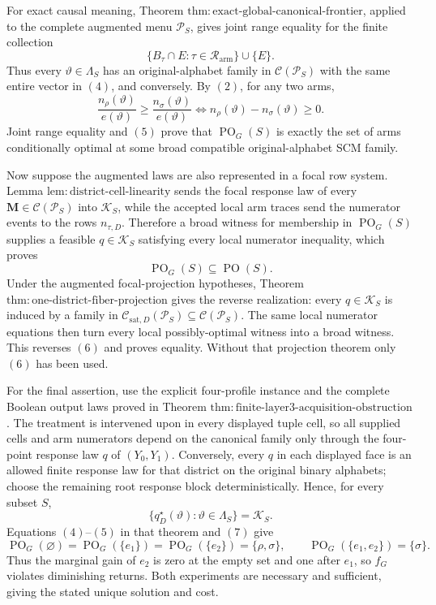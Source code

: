 For exact causal meaning, Theorem \(\mathrm{thm:exact\text{-}global\text{-}canonical\text{-}frontier}\), applied to the complete augmented menu \(\mathcal P_S\), gives joint range equality for the finite collection
\[
\{B_\tau\cap E:\tau\in\mathcal R_{\mathrm{arm}}\}\cup\{E\}.
\tag{4}
\]
Thus every \(\vartheta\in\Lambda_S\) has an original-alphabet family in \(\mathcal C(\mathcal P_S)\) with the same entire vector in \((4)\), and conversely.  By \((2)\), for any two arms,
\[
\frac{n_\rho(\vartheta)}{e(\vartheta)}
\geq
\frac{n_\sigma(\vartheta)}{e(\vartheta)}
\Longleftrightarrow
n_\rho(\vartheta)-n_\sigma(\vartheta)\geq0.
\tag{5}
\]
Joint range equality and \((5)\) prove that \(\operatorname{PO}_G(S)\) is exactly the set of arms conditionally optimal at some broad compatible original-alphabet SCM family.

Now suppose the augmented laws are also represented in a focal row system.  Lemma \(\mathrm{lem:district\text{-}cell\text{-}linearity}\) sends the focal response law of every \(\mathbf M\in\mathcal C(\mathcal P_S)\) into \(\mathcal K_S\), while the accepted local arm traces send the numerator events to the rows \(n_{\tau,D}\).  Therefore a broad witness for membership in \(\operatorname{PO}_G(S)\) supplies a feasible \(q\in\mathcal K_S\) satisfying every local numerator inequality, which proves
\[
\operatorname{PO}_G(S)\subseteq\operatorname{PO}(S).
\tag{6}
\]
Under the augmented focal-projection hypotheses, Theorem \(\mathrm{thm:one\text{-}district\text{-}fiber\text{-}projection}\) gives the reverse realization: every \(q\in\mathcal K_S\) is induced by a family in \(\mathcal C_{\mathrm{sat},D}(\mathcal P_S)\subseteq\mathcal C(\mathcal P_S)\).  The same local numerator equations then turn every local possibly-optimal witness into a broad witness.  This reverses \((6)\) and proves equality.  Without that projection theorem only \((6)\) has been used.

For the final assertion, use the explicit four-profile instance and the complete Boolean output laws proved in Theorem \(\mathrm{thm:finite\text{-}layer3\text{-}acquisition\text{-}obstruction}\).  The treatment is intervened upon in every displayed tuple cell, so all supplied cells and arm numerators depend on the canonical family only through the four-point response law \(q\) of \((Y_0,Y_1)\).  Conversely, every \(q\) in each displayed face is an allowed finite response law for that district on the original binary alphabets; choose the remaining root response block deterministically.  Hence, for every subset \(S\),
\[
\{q_D^\star(\vartheta):\vartheta\in\Lambda_S\}=\mathcal K_S.
\tag{7}
\]
Equations \((4)\)--\((5)\) in that theorem and \((7)\) give
\[
\operatorname{PO}_G(\varnothing)
=\operatorname{PO}_G(\{e_1\})
=\operatorname{PO}_G(\{e_2\})=\{\rho,\sigma\},
\qquad
\operatorname{PO}_G(\{e_1,e_2\})=\{\sigma\}.
\]
Thus the marginal gain of \(e_2\) is zero at the empty set and one after \(e_1\), so \(f_G\) violates diminishing returns.  Both experiments are necessary and sufficient, giving the stated unique solution and cost.